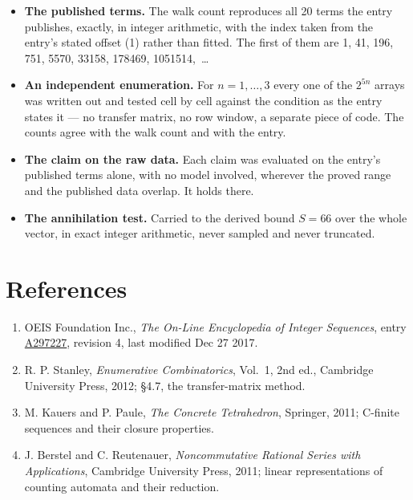 \documentclass[11pt]{article}
\theoremstyle{definition}
\begin{document}
\begin{itemize}

\item {\bfseries The published terms.} The walk count reproduces all 20 terms the entry publishes, exactly, in integer arithmetic, with the index taken from the entry's stated offset (1) rather than fitted. The first of them are 1, 41, 196, 751, 5570, 33158, 178469, 1051514,~\dots

\item {\bfseries An independent enumeration.} For $n = 1,\dots,3$ every one of the $2^{5n}$ arrays was written out and tested cell by cell against the condition as the entry states it --- no transfer matrix, no row window, a separate piece of code. The counts agree with the walk count and with the entry.

\item {\bfseries The claim on the raw data.} Each claim was evaluated on the entry's published terms alone, with no model involved, wherever the proved range and the published data overlap. It holds there.

\item {\bfseries The annihilation test.} Carried to the derived bound $S = 66$ over the whole vector, in exact integer arithmetic, never sampled and never truncated.

\end{itemize}

\section{References}

\begin{enumerate}

\item OEIS Foundation Inc., \emph{The On-Line Encyclopedia of Integer Sequences}, entry \href{https://oeis.org/A297227}{A297227}, revision 4, last modified Dec 27 2017.

\item R. P. Stanley, \emph{Enumerative Combinatorics}, Vol.~1, 2nd ed., Cambridge University Press, 2012; \S4.7, the transfer-matrix method.

\item M. Kauers and P. Paule, \emph{The Concrete Tetrahedron}, Springer, 2011; C-finite sequences and their closure properties.

\item J. Berstel and C. Reutenauer, \emph{Noncommutative Rational Series with Applications}, Cambridge University Press, 2011; linear representations of counting automata and their reduction.

\end{enumerate}
\end{document}
